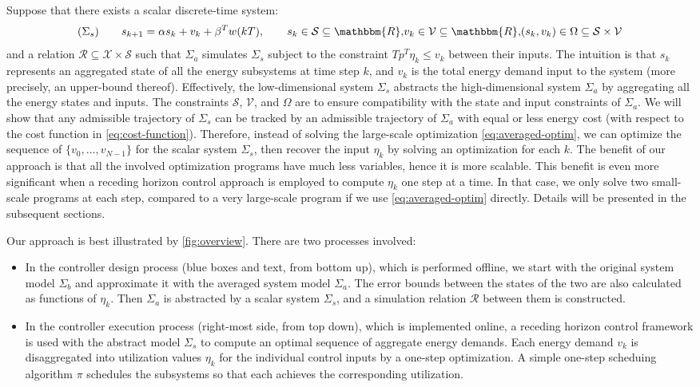 Suppose that there exists a scalar discrete-time system:
\[ (\Sigma_s) \hspace{2em} s_{k + 1} = \alpha s_k + v_k + \beta^T w (kT),
   \hspace{2em} s_k \in \mathcal{S} \subseteq \mathbbm{R} \comma v_k \in
   \mathcal{V} \subseteq \mathbbm{R} \comma (s_k, v_k) \in \Omega \subseteq
   \mathcal{S} \times \mathcal{V} \]
and a relation $\mathcal{R} \subseteq \mathcal{X} \times \mathcal{S}$ such
that $\Sigma_a$ simulates $\Sigma_s$ subject to the constraint $T p^T \eta_k
\leqslant v_k$ between their inputs. The intuition is that $s_k$ represents an
aggregated state of all the energy subsystems at time step $k$, and $v_k$ is
the total energy demand input to the system (more precisely, an upper-bound
thereof). Effectively, the low-dimensional system $\Sigma_s$ abstracts the
high-dimensional system $\Sigma_a$ by aggregating all the energy states and
inputs. The constraints $\mathcal{S}$, $\mathcal{V}$, and $\Omega$ are to
ensure compatibility with the state and input constraints of $\Sigma_a$. We
will show that any admissible trajectory of $\Sigma_s$ can be tracked by an
admissible trajectory of $\Sigma_a$ with equal or less energy cost (with
respect to the cost function in \eqref{eq:cost-function}). Therefore, instead
of solving the large-scale optimization \eqref{eq:averaged-optim}, we can
optimize the sequence of $\{ v_0, \ldots, v_{N - 1} \}$ for the scalar system
$\Sigma_s$, then recover the input $\eta_k$ by solving an optimization for
each $k$. The benefit of our approach is that all the involved optimization
programs have much less variables, hence it is more scalable. This benefit is
even more significant when a receding horizon control approach is employed to
compute $\eta_k$ one step at a time. In that case, we only solve two
small-scale programs at each step, compared to a very large-scale program if
we use \eqref{eq:averaged-optim} directly. 
Details will be presented in the subsequent sections.

Our approach is best illustrated by \cref{fig:overview}. There are two
processes involved:
\begin{itemize}
  \item In the controller design process (blue boxes and text, from bottom
  up), which is performed offline, we start with the original system model
  $\Sigma_b$ and approximate it with the averaged system model $\Sigma_a$. The
  error bounds between the states of the two are also calculated as functions
  of $\eta_k$. Then $\Sigma_a$ is abstracted by a scalar system $\Sigma_s$,
  and a simulation relation $\mathcal{R}$ between them is constructed.
  
  \item In the controller execution process (right-most side, from top down),
  which is implemented online, a receding horizon control framework is used
  with the abstract model $\Sigma_s$ to compute an optimal sequence of
  aggregate energy demands. Each energy demand $v_k$ is disaggregated into
  utilization values $\eta_k$ for the individual control inputs by a one-step
  optimization. A simple one-step scheduing algorithm $\pi$ schedules the
  subsystems so that each achieves the corresponding utilization.
\end{itemize}


